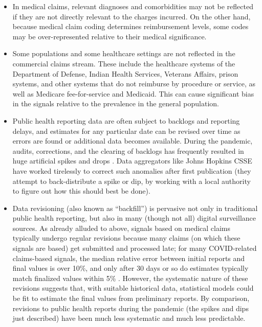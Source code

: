 \documentclass{article}
\begin{document}
\begin{itemize}
\item In medical claims, relevant diagnoses and comorbidities may not be
  reflected if they are not directly relevant to the charges incurred.  On the
  other hand, because medical claim coding determines reimbursement levels, some
  codes may be over-represented relative to their medical significance. 

\item Some populations and some healthcare settings are not reflected in the
  commercial claims stream.  These include the healthcare systems of the
  Department of Defense, Indian Health Services, Veterans Affairs, prison
  systems, and other systems that do not reimburse by procedure or service, as
  well as Medicare fee-for-service and Medicaid.  This can cause significant
  bias in the signals relative to the prevalence in the general population. 

\item Public health reporting data are often subject to backlogs and reporting
  delays, and estimates for any particular date can be revised over time as
  errors are found or additional data becomes available.  During the pandemic,
  audits, corrections, and the clearing of backlogs has frequently resulted in
  huge artificial spikes and drops \citep{ArvisaisAnhalt:2021}.  Data
  aggregators like Johns Hopkins CSSE \citep{Dong:2020} have worked tirelessly
  to correct such anomalies after first publication (they attempt to
  back-distribute a spike or dip, by working with a local authority to figure
  out how this should best be done). 

\item Data revisioning (also known as ``backfill'') is pervasive not only in
  traditional public health reporting, but also in many (though not all) digital
  surveillance sources.  As already alluded to above, signals based on medical
  claims typically undergo regular revisions because many claims (on which these 
  signals are based) get submitted and processed late; for many COVID-related
  claims-based signals, the median relative error between initial reports and
  final values is over 10\%, and only after 30 days or so do estimates typically
  match finalized values within 5\% \citep{Reinhart:2021}.  However, the
  systematic nature of these revisions suggests that, with suitable historical
  data, statistical models could be fit to estimate the final values from
  preliminary reports.  By comparison, revisions to public health reports during
  the pandemic (the spikes and dips just described) have been much less
  systematic and much less predictable.


\end{itemize}
\end{document}

